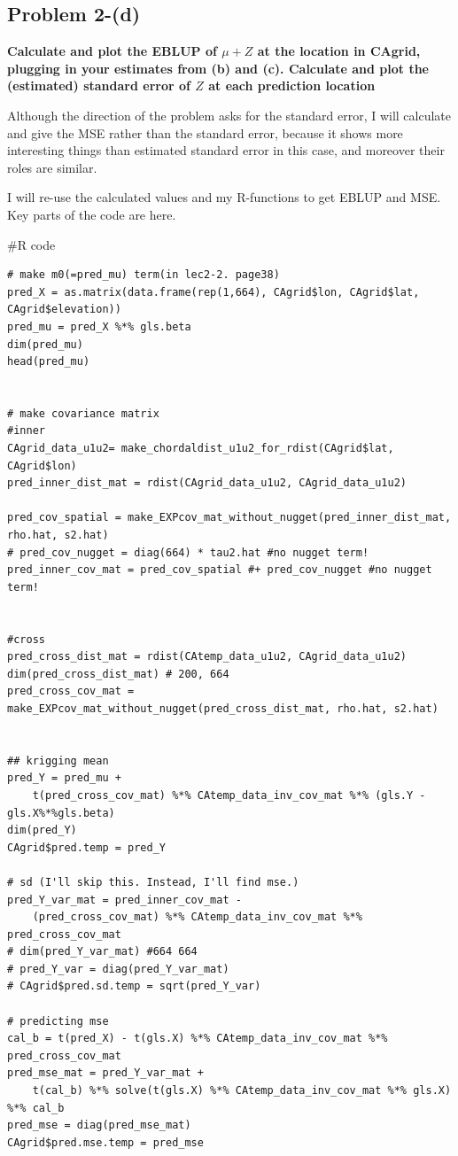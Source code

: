 \documentclass{article}
\newenvironment{Rcode}%
{%
    \begin{mdframed}
    \#R code
    \begin{small}
}
{%
    \end{small}
    \end{mdframed}
}
\begin{document}
\clearpage
\subsection{Problem 2-(d)}
\textbf{
Calculate and plot the EBLUP of $\mu+Z$ at the location in CAgrid,
plugging in your estimates from (b) and (c).
Calculate and plot the (estimated) standard error of $Z$ at each prediction location
}

Although the direction of the problem asks for the standard error, 
I will calculate and give the MSE rather than the standard error,
because it shows more interesting things than estimated standard error in this case,
and moreover their roles are similar.

I will re-use the calculated values and my R-functions to get EBLUP and MSE.
Key parts of the code are here.


\begin{Rcode}
    \begin{verbatim}
# make m0(=pred_mu) term(in lec2-2. page38)
pred_X = as.matrix(data.frame(rep(1,664), CAgrid$lon, CAgrid$lat, CAgrid$elevation))
pred_mu = pred_X %*% gls.beta
dim(pred_mu)
head(pred_mu)


# make covariance matrix
#inner
CAgrid_data_u1u2= make_chordaldist_u1u2_for_rdist(CAgrid$lat, CAgrid$lon)
pred_inner_dist_mat = rdist(CAgrid_data_u1u2, CAgrid_data_u1u2)

pred_cov_spatial = make_EXPcov_mat_without_nugget(pred_inner_dist_mat, rho.hat, s2.hat)
# pred_cov_nugget = diag(664) * tau2.hat #no nugget term!
pred_inner_cov_mat = pred_cov_spatial #+ pred_cov_nugget #no nugget term!


#cross
pred_cross_dist_mat = rdist(CAtemp_data_u1u2, CAgrid_data_u1u2)
dim(pred_cross_dist_mat) # 200, 664
pred_cross_cov_mat = make_EXPcov_mat_without_nugget(pred_cross_dist_mat, rho.hat, s2.hat)


## krigging mean
pred_Y = pred_mu + 
    t(pred_cross_cov_mat) %*% CAtemp_data_inv_cov_mat %*% (gls.Y - gls.X%*%gls.beta)
dim(pred_Y)
CAgrid$pred.temp = pred_Y

# sd (I'll skip this. Instead, I'll find mse.)
pred_Y_var_mat = pred_inner_cov_mat - 
    (pred_cross_cov_mat) %*% CAtemp_data_inv_cov_mat %*% pred_cross_cov_mat
# dim(pred_Y_var_mat) #664 664
# pred_Y_var = diag(pred_Y_var_mat)
# CAgrid$pred.sd.temp = sqrt(pred_Y_var)

# predicting mse
cal_b = t(pred_X) - t(gls.X) %*% CAtemp_data_inv_cov_mat %*% pred_cross_cov_mat
pred_mse_mat = pred_Y_var_mat + 
    t(cal_b) %*% solve(t(gls.X) %*% CAtemp_data_inv_cov_mat %*% gls.X) %*% cal_b
pred_mse = diag(pred_mse_mat)
CAgrid$pred.mse.temp = pred_mse
    \end{verbatim}
\end{Rcode}
\end{document}
